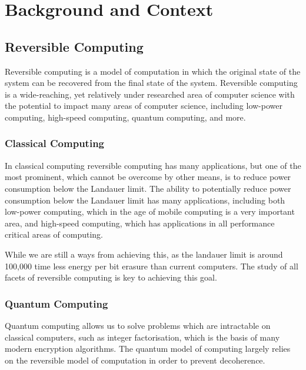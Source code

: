 \chapter*{Background and Context}

\section{Reversible Computing}\label{sec:reversible-computing}
Reversible computing is a model of computation in which the original state of the system can be recovered from the final state of the system\cite{LogicalBasis}.
Reversible computing is a wide-reaching, yet relatively under researched area of computer science with the potential to impact many areas of computer science, including low-power computing\cite{LandauerLimit}, high-speed computing, quantum computing, and more.

\subsection{Classical Computing}\label{subsec:classical-computing}
In classical computing reversible computing has many applications, but one of the most prominent, which cannot be overcome by other means, is to reduce power consumption below the Landauer limit\cite{LandauerLimit}.
The ability to potentially reduce power consumption below the Landauer limit has many applications, including both low-power computing, which in the age of mobile computing is a very important area, and high-speed computing, which has applications in all performance critical areas of computing.

While we are still a ways from achieving this, as the landauer limit is around 100,000 time less energy per bit erasure than current computers.
The study of all facets of reversible computing is key to achieving this goal.

\subsection{Quantum Computing}\label{subsec:quantum-computing}
Quantum computing allows us to solve problems which are intractable on classical computers, such as integer factorisation, which is the basis of many modern encryption algorithms.
The quantum model of computing largely relies on the reversible model of computation in order to prevent decoherence.


